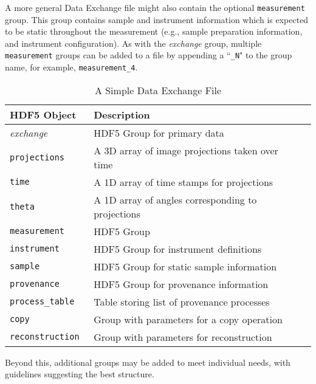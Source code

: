 \documentclass[pdf]{iucr}              %
\begin{document}
A more general Data Exchange file might also contain the optional \texttt{measurement} group. This group contains sample and instrument information which is expected to be static throughout the measurement (e.g., sample preparation information, and instrument configuration). As with the \emph{exchange} group, multiple \texttt{measurement} groups can be added to a file by appending a ``\texttt{\_N}" to the group name, for example, \texttt{measurement\_4}.

\begin{table}
\centering
\footnotesize
\caption{A Simple Data Exchange File}
\label{tab:genrules}
\begin{tabular}{l l l}
\toprule
\bfseries HDF5 Object & \bfseries Description \\
\midrule
\emph{exchange} & HDF5 Group for primary data \\
\hspace{2pt} \tt{projections} & A 3D array of image projections taken over time \\
\hspace{2pt} \tt{time} & A 1D array of time stamps for projections \\
\hspace{2pt} \tt{theta} & A 1D array of angles corresponding to projections  \\
\tt{measurement} & HDF5  Group \\
\hspace{2pt} \tt{instrument} & HDF5 Group for instrument definitions \\
\hspace{2pt} \tt{sample} & HDF5 Group for static sample information \\
\tt{provenance} & HDF5 Group for provenance information \\
\hspace{2pt} \tt{process\_table} & Table storing list of provenance processes \\
\hspace{2pt} \tt{copy} & Group with parameters for a copy operation \\
\hspace{2pt} \tt{reconstruction} & Group with parameters for reconstruction \\
\bottomrule
\end{tabular}
\end{table}


Beyond this, additional groups may be added to meet individual needs, with guidelines suggesting the best structure.
\end{document}
